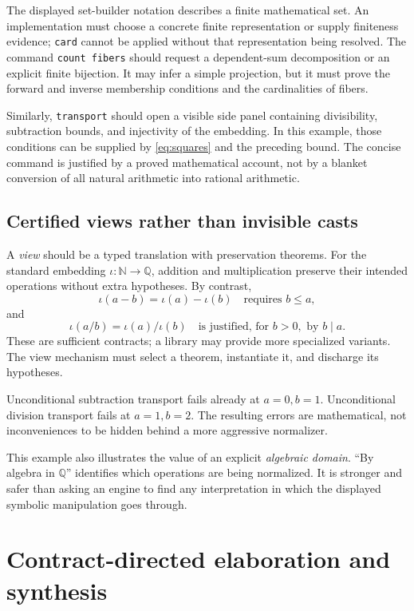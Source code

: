 \documentclass[11pt,a4paper]{article}
\newcommand{\code}[1]{\texttt{\small #1}}
\newcommand{\Q}{\mathbb Q}
\newcommand{\N}{\mathbb N}
\theoremstyle{definition}
\theoremstyle{remark}
\begin{document}
The displayed set-builder notation describes a finite mathematical set. An implementation must choose a concrete finite representation or supply finiteness evidence; \code{card} cannot be applied without that representation being resolved. The command \code{count fibers} should request a dependent-sum decomposition or an explicit finite bijection. It may infer a simple projection, but it must prove the forward and inverse membership conditions and the cardinalities of fibers.

Similarly, \code{transport} should open a visible side panel containing divisibility, subtraction bounds, and injectivity of the embedding. In this example, those conditions can be supplied by \eqref{eq:squares} and the preceding bound. The concise command is justified by a proved mathematical account, not by a blanket conversion of all natural arithmetic into rational arithmetic.

\subsection{Certified views rather than invisible casts}
A \emph{view} should be a typed translation with preservation theorems. For the standard embedding $\iota:\N\to\Q$, addition and multiplication preserve their intended operations without extra hypotheses. By contrast,
\[
 \iota(a-b)=\iota(a)-\iota(b)
 \quad\text{requires }b\le a,
\]
and
\[
 \iota(a/b)=\iota(a)/\iota(b)
 \quad\text{is justified, for }b>0,\text{ by }b\mid a.
\]
These are sufficient contracts; a library may provide more specialized variants. The view mechanism must select a theorem, instantiate it, and discharge its hypotheses.

Unconditional subtraction transport fails already at $a=0,b=1$. Unconditional division transport fails at $a=1,b=2$. The resulting errors are mathematical, not inconveniences to be hidden behind a more aggressive normalizer.

This example also illustrates the value of an explicit \emph{algebraic domain}. ``By algebra in $\Q$'' identifies which operations are being normalized. It is stronger and safer than asking an engine to find any interpretation in which the displayed symbolic manipulation goes through.

\section{Contract-directed elaboration and synthesis}
\label{sec:synthesis}
\end{document}
